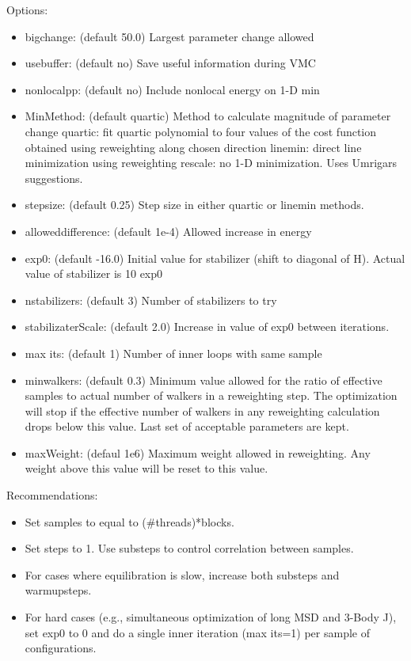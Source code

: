 Options:
\begin{itemize}
  \item{bigchange: (default 50.0) Largest parameter change allowed}
  \item{usebuffer: (default no) Save useful information during VMC}
  \item{nonlocalpp: (default no) Include nonlocal energy on 1-D min}
  \item{MinMethod: (default quartic) Method to calculate magnitude of parameter change
quartic: fit quartic polynomial to four values of the cost function obtained using reweighting 
along chosen direction linemin: direct line minimization using reweighting rescale:
no 1-D minimization. Uses Umrigars suggestions.}
  \item{stepsize: (default 0.25) Step size in either quartic or linemin methods.}
  \item{alloweddifference: (default 1e-4) Allowed increase in energy}
  \item{exp0: (default -16.0) Initial value for stabilizer (shift to diagonal of H). Actual value
of stabilizer is 10 exp0}
  \item{nstabilizers: (default 3) Number of stabilizers to try}
  \item{stabilizaterScale: (default 2.0) Increase in value of exp0 between iterations.}
  \item{max its: (default 1) Number of inner loops with same sample}
  \item{minwalkers: (default 0.3) Minimum value allowed for the ratio of effective samples
to actual number of walkers in a reweighting step. The optimization will stop if the
effective number of walkers in any reweighting calculation drops below this value. Last
set of acceptable parameters are kept.}
  \item{maxWeight: (defaul 1e6) Maximum weight allowed in reweighting. Any weight above
this value will be reset to this value.}
\end{itemize}

Recommendations:
\begin{itemize}
  \item{Set samples to equal to (\#threads)*blocks.}
  \item{Set steps to 1. Use substeps to control correlation between samples.}
  \item{For cases where equilibration is slow, increase both substeps and warmupsteps.}
  \item{For hard cases (e.g., simultaneous optimization of long MSD and 3-Body J), set exp0
to 0 and do a single inner iteration (max its=1) per sample of configurations.}
\end{itemize}


